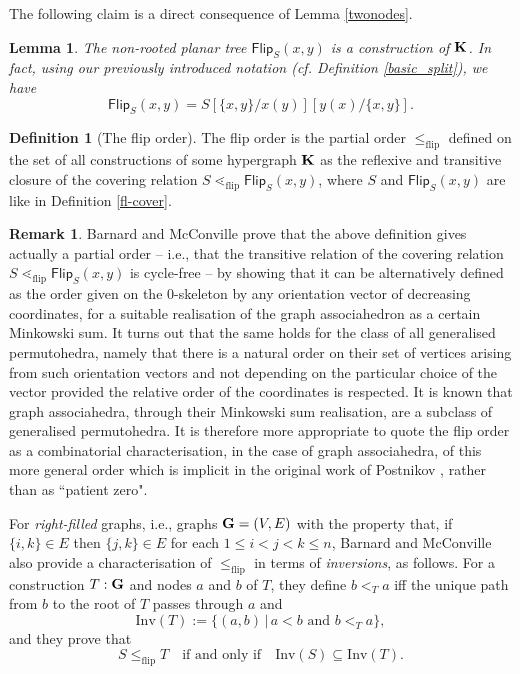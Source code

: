 \documentclass{article}
\theoremstyle{plain}
\newtheorem{lemma}[thm]{Lemma}
\theoremstyle{definition}
\newtheorem{definition}[thm]{Definition}
\newtheorem{remark}[thm]{Remark}
\newcommand{\hyper}[1]{{\bf #1}}
\newcommand{\Inv}{{\mathrm{Inv}}}
\begin{document}
The following claim is a direct consequence of Lemma \ref{twonodes}.
\begin{lemma} \label{diamond-lemma}
The non-rooted planar tree $\mathsf{Flip}_S(x,y)$ is a construction of $\hyper{K}$. In fact, using our previously introduced notation (cf. Definition \ref{basic_split}), we have 
$$
{\mathsf{Flip}}_S(x,y) = S[\{x,y\}/x(y)][y(x)/\{x,y\}] .$$
\end{lemma}

\begin{definition}[The flip order] \label{flip-order}
The flip order  is the partial order $\leq_{\operatorname{flip}}$ defined on the set of all constructions of some hypergraph ${\bf K}$ as the reflexive and transitive closure of the covering relation $S\lessdot_{\operatorname{flip}}\mathsf{Flip}_S(x,y)$, where $S$ and $\mathsf{Flip}_S(x,y)$ are like in Definition \ref{fl-cover}. 
\end{definition}

\begin{remark} \label{natural order}
Barnard and McConville prove that the above definition gives actually a partial order --  i.e., that the transitive relation of the covering relation $S\lessdot_{\operatorname{flip}}\mathsf{Flip}_S(x,y)$ is cycle-free --
by showing that it can be alternatively defined as the order given on the 0-skeleton by any orientation vector of decreasing coordinates, for a suitable realisation of the graph associahedron as a certain Minkowski sum.
It turns out that the same holds for the class of all generalised permutohedra, namely that there is a natural order on their set of vertices arising from  such orientation vectors and not depending on the particular choice of the vector provided the relative order of the coordinates is respected.  It is known that graph associahedra, through their Minkowski sum realisation, are a subclass of generalised permutohedra. It is therefore more appropriate to quote the flip order as a combinatorial  characterisation, in the case of graph associahedra, of this more general order which is implicit in the original work of Postnikov \cite{P09}, rather than as  ``patient zero".
\end{remark}
For {\em right-filled} graphs, i.e., graphs ${\bf G}=(V,E)$ with the property that, if $\{i,k\}\in E$ then $\{j,k\}\in E$ for each $1\leq i<j<k\leq n$, Barnard and McConville also provide a characterisation of $\leq_{\operatorname{flip}}$ in terms of {\em inversions}, as follows. For a construction $T:{\bf G}$ and nodes $a$ and $b$ of $T$, they define $b<_{T} a$ iff the unique
path from $b$ to the root of $T$ passes through $a$ and
$$\Inv(T):=\{(a,b)\,|\, a<b \mbox{ and } b<_{T} a\},$$
and they prove that 
 \begin{equation}S\leq_{\operatorname{flip}} T \quad \mbox{if and only if} \quad \Inv(S)\subseteq \Inv(T).\label{inversions_char}\end{equation}
\end{document}
